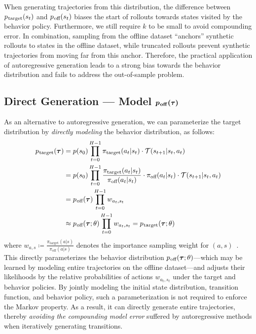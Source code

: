 \documentclass[10pt]{article} %
\theoremstyle{plain}
\theoremstyle{definition}
\theoremstyle{remark}
\newcommand{\ptarg}{p_{\mkern1mu\text{target}}}
\newcommand{\poff}{p_{\mkern1mu\text{off}}}
\begin{document}
When generating trajectories from this distribution, the difference between $\ptarg(s_t)$ and $\poff(s_t)$ biases the start of rollouts towards states visited by the behavior policy.
Furthermore, we still require $k$ to be small to avoid compounding error.
In combination, sampling from the offline dataset ``anchors'' synthetic rollouts to states in the offline dataset, while truncated rollouts prevent synthetic trajectories from moving far from this anchor.
Therefore, the practical application of autoregressive generation leads to a strong bias towards the behavior distribution and fails to address the out-of-sample problem.









\subsection{Direct Generation --- Model $\bm{p_{\mkern1mu\text{\textbf{off}}}(\tau)}$}
\label{sec:joint}
As an alternative to autoregressive generation, we can parameterize the target distribution by \textit{directly modeling} the behavior distribution, as follows:
\begin{align}
    \notag \ptarg(\bm{\tau}) &= p(s_0) \prod_{t=0}^{H-1} \pi_{\text{target}}(a_t|s_t) \cdot \mathcal{T}(s_{t+1}|s_t, a_t) \\
    \notag &= p(s_0) \prod_{t=0}^{H-1} \frac{\pi_{\text{target}}(a_t|s_t)}{\pi_{\text{off}}(a_t|s_t)} \cdot \pi_{\text{off}}(a_t|s_t) \cdot \mathcal{T}(s_{t+1}|s_t, a_t) \\
    \notag &= \poff(\bm{\tau}) \prod_{t=0}^{H-1} w_{a_t, s_t} \\
    & \approx \poff(\bm{\tau};\theta) \prod_{t=0}^{H-1} w_{a_t, s_t} = \ptarg(\bm{\tau};\theta) \label{eq:importance}
\end{align}
where $w_{a, s} \coloneqq \frac{\pi_{\text{target}}(a|s)}{\pi_{\text{off}}(a|s)}$ denotes the importance sampling weight for $(a, s)$~\citep{precup2000eligibility}.
This directly parameterizes the behavior distribution $\poff(\bm{\tau};\theta)$---which may be learned by modeling entire trajectories on the offline dataset---and adjusts their likelihoods by the relative probabilities of actions $w_{a_t, s_t}$ under the target and behavior policies.
By jointly modeling the initial state distribution, transition function, and behavior policy, such a parameterization is not required to enforce the Markov property.
As a result, it can directly generate entire trajectories, thereby \textit{avoiding the compounding model error} suffered by autoregressive methods when iteratively generating transitions.
\end{document}

